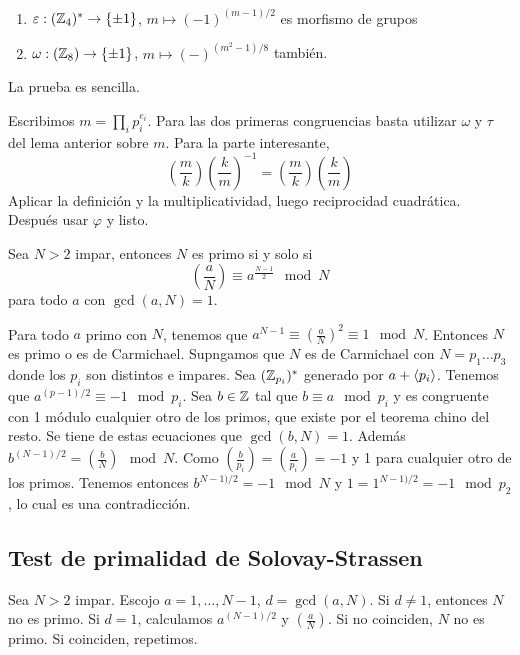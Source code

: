 \documentclass[CR.tex]{subfiles}
\begin{document}
\begin{lemma}
\begin{enumerate}
\item $\varepsilon:(\mathbb{Z}_4)^*\to \{\pm 1\}$, $m\mapsto (-1)^{(m-1)/2}$ es morfismo de grupos
\item $\omega:(\mathbb{Z}_8)\to\{\pm 1\}$, $m\mapsto (-)^{(m^2-1)/8}$ también.
\end{enumerate}
\end{lemma}
La prueba es sencilla. 

\begin{dem}
Escribimos $m=\prod_i p_i^{e_i}$. Para las dos primeras congruencias basta utilizar $\omega$ y $\tau$ del lema anterior sobre $m$. Para la parte interesante, 
\[
(\frac{m}{k})(\frac{k}{m})^{-1}=(\frac{m}{k})(\frac{k}{m})
\]
Aplicar la definición y la multiplicatividad, luego reciprocidad cuadrática. Después usar $\varphi$ y listo. 
\end{dem}

\begin{prop}
Sea $N>2$ impar, entonces $N$ es primo si y solo si 
\[
\left(\frac{a}{N}\right)\equiv a^{\frac{N-1}{2}}\mod N
\]
para todo $a$ con $\gcd(a,N)=1$.
\end{prop}
\begin{dem}
Para todo $a$ primo con $N$, tenemos que $a^{N-1}\equiv (\frac{a}{N})^2\equiv 1\mod N$. Entonces $N$ es primo o es de Carmichael. Supngamos que $N$ es de Carmichael con $N=p_1\dots p_3$ donde los $p_i$ son distintos e impares. Sea $(\mathbb{Z}_{p_i})^*$ generado por $a+\langle{p_i}\rangle$. Tenemos que $a^{(p-1)/2}\equiv -1\mod p_i$. Sea $b\in\mathbb{Z}$ tal que $b\equiv a\mod p_i$ y es congruente con 1 módulo cualquier otro de los primos, que existe por el teorema chino del resto. Se tiene de estas ecuaciones que $\gcd(b,N)=1$. Además $b^{(N-1)/2}=(\frac{b}{N})\mod N$. Como $(\frac{b}{p_i})=(\frac{a}{p_i})=-1$ y 1 para cualquier otro de los primos. Tenemos entonces  $b^{N-1)/2}=-1\mod N$ y $1=1^{N-1)/2}=-1\mod p_2$, lo cual es una contradicción.
\end{dem}

\subsection{Test de primalidad de Solovay-Strassen}
Sea $N>2$ impar. Escojo $a=1,\dots, N-1$, $d=\gcd(a,N)$. Si $d\neq 1$, entonces $N$ no es primo. Si $d=1$, calculamos $a^{(N-1)/2}$ y $(\frac{a}{N})$. Si no coinciden, $N$ no es primo. Si coinciden, repetimos.
\end{document}
